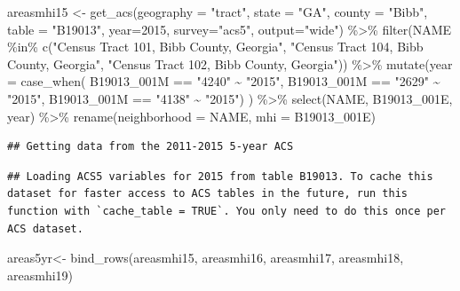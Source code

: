 \documentclass[
]{article}
\newenvironment{Shaded}{\begin{snugshade}}{\end{snugshade}}
\newcommand{\AttributeTok}[1]{\textcolor[rgb]{0.77,0.63,0.00}{#1}}
\newcommand{\DecValTok}[1]{\textcolor[rgb]{0.00,0.00,0.81}{#1}}
\newcommand{\FunctionTok}[1]{\textcolor[rgb]{0.00,0.00,0.00}{#1}}
\newcommand{\NormalTok}[1]{#1}
\newcommand{\OtherTok}[1]{\textcolor[rgb]{0.56,0.35,0.01}{#1}}
\newcommand{\SpecialCharTok}[1]{\textcolor[rgb]{0.00,0.00,0.00}{#1}}
\newcommand{\StringTok}[1]{\textcolor[rgb]{0.31,0.60,0.02}{#1}}
\begin{document}
\begin{Shaded}
\begin{Highlighting}[]
\NormalTok{areasmhi15 }\OtherTok{\textless{}{-}} \FunctionTok{get\_acs}\NormalTok{(}\AttributeTok{geography =} \StringTok{"tract"}\NormalTok{, }\AttributeTok{state =} \StringTok{"GA"}\NormalTok{, }\AttributeTok{county =} \StringTok{"Bibb"}\NormalTok{, }\AttributeTok{table =} \StringTok{"B19013"}\NormalTok{, }\AttributeTok{year=}\DecValTok{2015}\NormalTok{, }\AttributeTok{survey=}\StringTok{"acs5"}\NormalTok{, }\AttributeTok{output=}\StringTok{"wide"}\NormalTok{) }\SpecialCharTok{\%\textgreater{}\%}
\FunctionTok{filter}\NormalTok{(NAME }\SpecialCharTok{\%in\%} \FunctionTok{c}\NormalTok{(}\StringTok{"Census Tract 101, Bibb County, Georgia"}\NormalTok{, }\StringTok{"Census Tract 104, Bibb County, Georgia"}\NormalTok{, }\StringTok{"Census Tract 102, Bibb County, Georgia"}\NormalTok{)) }\SpecialCharTok{\%\textgreater{}\%}
\FunctionTok{mutate}\NormalTok{(}\AttributeTok{year =} \FunctionTok{case\_when}\NormalTok{(}
\NormalTok{  B19013\_001M }\SpecialCharTok{==} \StringTok{"4240"} \SpecialCharTok{\textasciitilde{}} \StringTok{"2015"}\NormalTok{,}
\NormalTok{  B19013\_001M }\SpecialCharTok{==} \StringTok{"2629"} \SpecialCharTok{\textasciitilde{}} \StringTok{"2015"}\NormalTok{,}
\NormalTok{  B19013\_001M }\SpecialCharTok{==} \StringTok{"4138"} \SpecialCharTok{\textasciitilde{}} \StringTok{"2015"}\NormalTok{) ) }\SpecialCharTok{\%\textgreater{}\%}
\FunctionTok{select}\NormalTok{(NAME, B19013\_001E, year) }\SpecialCharTok{\%\textgreater{}\%}
\FunctionTok{rename}\NormalTok{(}\AttributeTok{neighborhood =}\NormalTok{ NAME, }\AttributeTok{mhi =}\NormalTok{ B19013\_001E) }
\end{Highlighting}
\end{Shaded}

\begin{verbatim}
## Getting data from the 2011-2015 5-year ACS
\end{verbatim}

\begin{verbatim}
## Loading ACS5 variables for 2015 from table B19013. To cache this dataset for faster access to ACS tables in the future, run this function with `cache_table = TRUE`. You only need to do this once per ACS dataset.
\end{verbatim}

\begin{Shaded}
\begin{Highlighting}[]
\NormalTok{areas5yr}\OtherTok{\textless{}{-}} \FunctionTok{bind\_rows}\NormalTok{(areasmhi15, areasmhi16, areasmhi17, areasmhi18, areasmhi19) }
\end{Highlighting}
\end{Shaded}
\end{document}
